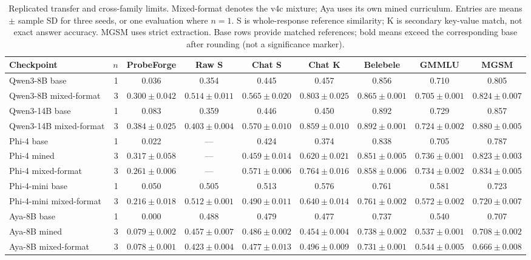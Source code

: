 \begin{table}[t]
\caption{Replicated transfer and cross-family limits. Mixed-format denotes the v4c mixture; Aya uses its own mined curriculum. Entries are means $\pm$ sample SD for three seeds, or one evaluation where $n=1$. S is whole-response reference similarity; K is secondary key-value match, not exact answer accuracy. MGSM uses strict extraction. Base rows provide matched references; bold means exceed the corresponding base after rounding (not a significance marker).}\label{t:replicated}
\centering\scriptsize\setlength{\tabcolsep}{3pt}
\begin{tabular}{lrccccccc}\toprule
Checkpoint & $n$ & ProbeForge & Raw S & Chat S & Chat K & Belebele & GMMLU & MGSM\\\midrule
Qwen3-8B base & 1 & 0.036 & 0.354 & 0.445 & 0.457 & 0.856 & 0.710 & 0.805\\
Qwen3-8B mixed-format & 3 & $\mathbf{0.300}\pm0.042$ & $\mathbf{0.514}\pm0.011$ & $\mathbf{0.565}\pm0.020$ & $\mathbf{0.803}\pm0.025$ & $\mathbf{0.865}\pm0.001$ & $0.705\pm0.001$ & $\mathbf{0.824}\pm0.007$\\
Qwen3-14B base & 1 & 0.083 & 0.359 & 0.446 & 0.450 & 0.892 & 0.729 & 0.857\\
Qwen3-14B mixed-format & 3 & $\mathbf{0.384}\pm0.025$ & $\mathbf{0.403}\pm0.004$ & $\mathbf{0.570}\pm0.010$ & $\mathbf{0.859}\pm0.010$ & $0.892\pm0.001$ & $0.724\pm0.002$ & $\mathbf{0.880}\pm0.005$\\
Phi-4 base & 1 & 0.022 & --- & 0.424 & 0.374 & 0.838 & 0.705 & 0.787\\
Phi-4 mined & 3 & $\mathbf{0.317}\pm0.058$ & --- & $\mathbf{0.459}\pm0.014$ & $\mathbf{0.620}\pm0.021$ & $\mathbf{0.851}\pm0.005$ & $\mathbf{0.736}\pm0.001$ & $\mathbf{0.823}\pm0.003$\\
Phi-4 mixed-format & 3 & $\mathbf{0.261}\pm0.006$ & --- & $\mathbf{0.571}\pm0.006$ & $\mathbf{0.764}\pm0.016$ & $\mathbf{0.858}\pm0.006$ & $\mathbf{0.734}\pm0.002$ & $\mathbf{0.834}\pm0.005$\\
Phi-4-mini base & 1 & 0.050 & 0.505 & 0.513 & 0.576 & 0.761 & 0.581 & 0.723\\
Phi-4-mini mixed-format & 3 & $\mathbf{0.216}\pm0.018$ & $\mathbf{0.512}\pm0.001$ & $0.490\pm0.011$ & $\mathbf{0.640}\pm0.014$ & $0.761\pm0.002$ & $0.572\pm0.002$ & $0.720\pm0.007$\\
Aya-8B base & 1 & 0.000 & 0.488 & 0.479 & 0.477 & 0.737 & 0.540 & 0.707\\
Aya-8B mined & 3 & $\mathbf{0.079}\pm0.002$ & $0.457\pm0.007$ & $\mathbf{0.486}\pm0.002$ & $0.454\pm0.004$ & $\mathbf{0.738}\pm0.002$ & $0.537\pm0.001$ & $\mathbf{0.708}\pm0.002$\\
Aya-8B mixed-format & 3 & $\mathbf{0.078}\pm0.001$ & $0.423\pm0.004$ & $0.477\pm0.013$ & $\mathbf{0.496}\pm0.009$ & $0.731\pm0.001$ & $\mathbf{0.544}\pm0.005$ & $0.666\pm0.008$\\
\bottomrule\end{tabular}
\end{table}
